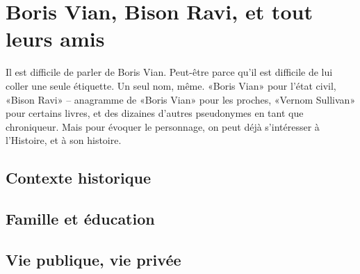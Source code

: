 
\section{Boris Vian, Bison Ravi, et tout leurs amis}


Il est difficile de parler de Boris Vian. Peut-être parce qu'il
est difficile de lui coller une seule étiquette. Un seul nom,
même. «Boris Vian» pour l'état civil, «Bison Ravi» -- anagramme
de «Boris Vian» pour les proches, «Vernom Sullivan» pour certains
livres, et des dizaines d'autres pseudonymes en tant que chroniqueur.
Mais pour évoquer le personnage, on peut déjà s'intéresser à l'Histoire,
et à son histoire.

\subsection{Contexte historique}


\subsection{Famille et éducation}


\subsection{Vie publique, vie privée}

